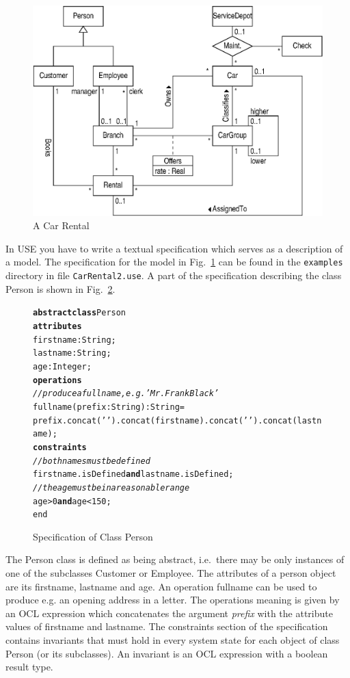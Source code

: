 \documentclass[11pt,a4paper]{article}
\newcommand{\USE}{USE}
\begin{document}
\begin{figure}[htbp]
  \begin{center}
    \includegraphics[width=\textwidth]{carrental2-uml}
    \caption{A Car Rental}
    \label{fig:CarRental}
  \end{center}
\end{figure}

In \USE{} you have to write a textual specification which serves as a
description of a model. The specification for the model in
Fig.~\ref{fig:CarRental} can be found in the \texttt{examples}
directory in file \texttt{CarRental2.use}. A part of the specification
describing the class Person is shown in Fig.~\ref{fig:classPerson}.

\begin{figure}[htbp]
\begin{small}
\begin{alltt}
\textbf{abstract} \textbf{class} Person
\textbf{attributes}
  firstname : String;
  lastname : String;
  age : Integer;
\textbf{operations}
  \emph{// produce a full name, e.g. 'Mr. Frank Black'}
  fullname(prefix : String) : String =
    prefix.concat(' ').concat(firstname).concat(' ').concat(lastname);
\textbf{constraints}
  \emph{// both names must be defined}
  firstname.isDefined \textbf{and} lastname.isDefined;
  \emph{// the age must be in a reasonable range}
  age > 0 \textbf{and} age < 150;
end
\end{alltt}
\end{small}
    \caption{Specification of Class Person}
    \label{fig:classPerson}
\end{figure}

The Person class is defined as being abstract, i.e.\ there may be only
instances of one of the subclasses Customer or Employee. The
attributes of a person object are its firstname, lastname and age. An
operation fullname can be used to produce e.g. an opening address in a
letter. The operations meaning is given by an OCL expression which
concatenates the argument \emph{prefix} with the attribute values of
firstname and lastname. The constraints section of the specification
contains invariants that must hold in every system state for each
object of class Person (or its subclasses). An invariant is an OCL
expression with a boolean result type.
\end{document}
